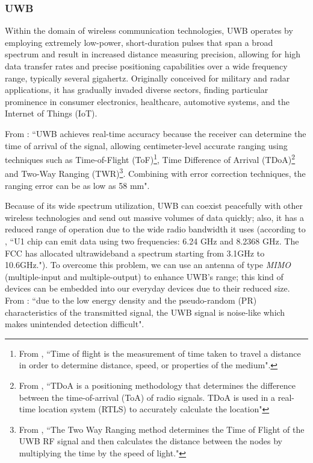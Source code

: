 \documentclass[english]{article}
\newcounter{subsubsubsection}[subsubsection]
\begin{document}
\subsubsection{UWB}\label{sec:uwb}
Within the domain of wireless communication technologies, UWB operates by employing extremely low-power, short-duration pulses that span a broad spectrum and result in increased distance measuring precision, allowing for high data transfer rates and precise positioning capabilities over a wide frequency range, typically several gigahertz. Originally conceived for military and radar applications, it has gradually invaded diverse sectors, finding particular prominence in consumer electronics, healthcare, automotive systems, and the Internet of Things (IoT).

From \cite{Coppens2022}: ``UWB achieves real-time accuracy because the receiver can determine the time of arrival of the signal, allowing centimeter-level accurate ranging using techniques such as Time-of-Flight (ToF)\footnote{From \cite{tof}, ``Time of flight is the measurement of time taken to travel a distance in order to determine distance, speed, or properties of the medium".}, Time Difference of Arrival (TDoA)\footnote{From \cite{tdoa}, ``TDoA is a positioning methodology that determines the difference between the time-of-arrival (ToA) of radio signals. TDoA is used in a real-time location system (RTLS) to accurately calculate the location"} and Two-Way Ranging (TWR)\footnote{From \cite{twr}, ``The Two Way Ranging method determines the Time of Flight of the UWB RF signal and then calculates the distance between the nodes by multiplying the time by the speed of light."}. Combining with error correction techniques, the ranging error can be as low as 58 mm".

Because of its wide spectrum utilization, UWB can coexist peacefully with other wireless technologies and send out massive volumes of data quickly; also, it has a reduced range of operation due to the wide radio bandwidth it uses (according to \cite{Zafar2019}, ``U1 chip can emit data using two frequencies: 6.24 GHz and 8.2368 GHz. The FCC has allocated ultrawideband a spectrum starting from 3.1GHz to 10.6GHz."). To overcome this problem, we can use an antenna of type \textit{MIMO} (multiple-input and multiple-output) to enhance UWB's range; this kind of devices can be embedded into our everyday devices due to their reduced size. From \cite{di2006uwb}: ``due to the low energy density and the pseudo-random (PR) characteristics of the transmitted signal, the UWB signal is noise-like which makes unintended detection difficult".
\end{document}
